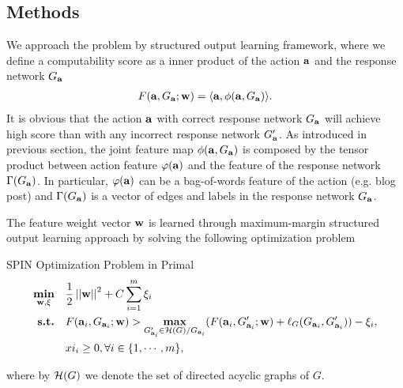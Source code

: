 {\subsection{Methods}
We approach the problem by structured output learning framework, where we define a computability score as a inner product of the action $\mathbf {a}$ and the response network $G_{\mathbf {a}}$
\begin{align*}
	F(\mathbf {a},G_{\mathbf {a}};\mathbf {w}) = \langle \mathbf {a}, \mathbf{\phi}(\mathbf {a},G_{\mathbf {a}}) \rangle.
\end{align*}
It is obvious that the action $\mathbf {a}$ with correct response network $G_{\mathbf {a}}$ will achieve high score than with any incorrect response network $G_{\mathbf {a}}'$.
As introduced in previous section, the joint feature map $\phi(\mathbf {a},G_{\mathbf {a}})$ is composed by the tensor product between action feature $\varphi(\mathbf {a})$ and the feature of the response network $\Gamma(G_{\mathbf {a}})$.
In particular, $\varphi(\mathbf {a})$ can be a bag-of-words feature of the action (e.g. blog post) and $\Gamma(G_{\mathbf {a}})$ is a vector of edges and labels in the response network $G_{\mathbf {a}}$.

The feature weight vector $\mathbf {w}$ is learned through maximum-margin structured output learning approach by solving the following optimization problem
\begin{definition}{SPIN Optimization Problem in Primal}
\begin{align*}
	\underset{\mathbf {w},\mathbf{\xi}}{\textbf{min}} &\quad \frac{1}{2}\left|\left| \mathbf {w} \right|\right|^2+C\sum_{i=1}^{m}\xi_i\\
	\textbf{s.t.} &\quad F(\mathbf {a}_i,G_{\mathbf {a}_i};\mathbf {w}) > \underset{G_{\mathbf {a}_i}'\in\mathcal{H}(G)/G_{\mathbf {a}_i}}{\textbf{max}}(F(\mathbf {a}_i,G_{\mathbf {a}_i}';\mathbf {w})+\mathbf {\ell}_{G}(G_{\mathbf {a}_i},G_{\mathbf {a}_i}')) - \xi_i,\\
	&\quad xi_i\ge0, \forall i\in\{1,\cdots,m\},
\end{align*}
\end{definition}
where by $\mathcal{H}(G)$ we denote the set of directed acyclic graphs of $G$.

}
